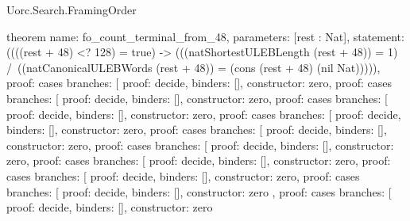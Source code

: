 \begin{lexlean}{Uorc.Search.FramingOrder}
\begin{semanticmodule}
theorem{
  name: fo_count_terminal_from_48,
  parameters: [rest : Nat],
  statement: ((((rest + 48) <? 128) = true) -> (((natShortestULEBLength (rest + 48)) = 1) /\ ((natCanonicalULEBWords (rest + 48)) = (cons (rest + 48) (nil Nat))))),
  proof: cases{
    branches: [
      {proof: decide{}, binders: [], constructor: zero},
      {
        proof: cases{
          branches: [
            {proof: decide{}, binders: [], constructor: zero},
            {
              proof: cases{
                branches: [
                  {proof: decide{}, binders: [], constructor: zero},
                  {
                    proof: cases{
                      branches: [
                        {proof: decide{}, binders: [], constructor: zero},
                        {
                          proof: cases{
                            branches: [
                              {proof: decide{}, binders: [], constructor: zero},
                              {
                                proof: cases{
                                  branches: [
                                    {proof: decide{}, binders: [], constructor: zero},
                                    {
                                      proof: cases{
                                        branches: [
                                          {proof: decide{}, binders: [], constructor: zero},
                                          {
                                            proof: cases{
                                              branches: [
                                                {proof: decide{}, binders: [], constructor: zero},
                                                {
                                                  proof: cases{
                                                    branches: [
                                                      {
                                                        proof: decide{},
                                                        binders: [],
                                                        constructor: zero
                                                      },
                                                      {
                                                        proof: cases{
                                                          branches: [
                                                            {
                                                              proof: decide{},
                                                              binders: [],
                                                              constructor: zero
}}}}}}}}}}}}}}}}}}}}}
\end{semanticmodule}
\end{lexlean}
